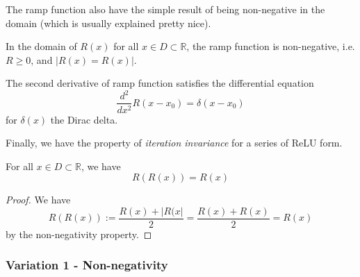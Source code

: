 The ramp function also have the simple result of being non-negative in the domain (which is usually explained pretty nice). 
\begin{proposition}
    In the domain of $R(x)$ for all $x\in D \subset \mathbb{R}$, the ramp function is non-negative, i.e. $R\geq 0$, and $|R(x)=R(x)|$. 
\end{proposition}
\begin{definition}
    The second derivative of ramp function satisfies the differential equation 
    \begin{equation}
        \frac{d^{2}}{dx^{2}} R(x-x_0) = \delta(x-x_0)
    \end{equation}
    for $\delta(x)$ the Dirac delta. 
\end{definition}
Finally, we have the property of \textit{iteration invariance} for a series of ReLU form. 
\begin{theorem}
    For all $x\in D\subset \mathbb{R}$, we have 
    \begin{equation}
        R(R(x)) = R(x)
    \end{equation}
\end{theorem}
\begin{proof}
    We have 
    \begin{equation}
        R(R(x)) := \frac{R(x)+|R(x|}{2} = \frac{R(x)+R(x)}{2} = R(x)
    \end{equation}
    by the non-negativity property. 
\end{proof}
\subsubsection{Variation 1 - Non-negativity}
